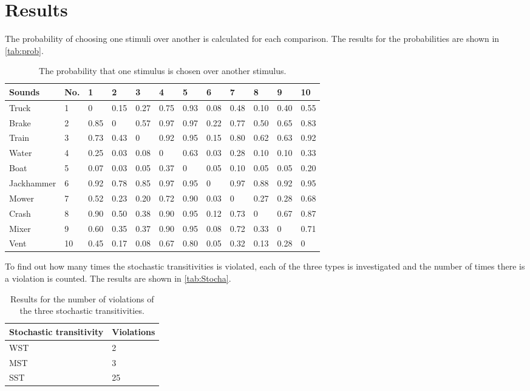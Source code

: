 \section*{Results}
\label{Results}
%
The probability of choosing one stimuli over another is calculated for each comparison. The results for the probabilities are shown in \autoref{tab:prob}. 
%
\begin{table}[H]
\centering
\begin{tabular}{@{}llllllllllll@{}}
\toprule
Sounds     & No. & 1    & 2    & 3    & 4    & 5    & 6    & 7    & 8    & 9    & 10 \\ \midrule
Truck      & 1   & 0    & 0.15 & 0.27 & 0.75 & 0.93 & 0.08 & 0.48 & 0.10 & 0.40 & 0.55 \\
Brake      & 2   & 0.85 & 0    & 0.57 & 0.97 & 0.97 & 0.22 & 0.77 & 0.50 & 0.65 & 0.83 \\
Train      & 3   & 0.73 & 0.43 & 0    & 0.92 & 0.95 & 0.15 & 0.80 & 0.62 & 0.63 & 0.92 \\
Water      & 4   & 0.25 & 0.03 & 0.08 & 0    & 0.63 & 0.03 & 0.28 & 0.10 & 0.10 & 0.33 \\
Boat       & 5   & 0.07 & 0.03 & 0.05 & 0.37 & 0    & 0.05 & 0.10 & 0.05 & 0.05 & 0.20 \\
Jackhammer & 6   & 0.92 & 0.78 & 0.85 & 0.97 & 0.95 & 0    & 0.97 & 0.88 & 0.92 & 0.95 \\
Mower      & 7   & 0.52 & 0.23 & 0.20 & 0.72 & 0.90 & 0.03 & 0    & 0.27 & 0.28 & 0.68 \\
Crash      & 8   & 0.90 & 0.50 & 0.38 & 0.90 & 0.95 & 0.12 & 0.73 & 0    & 0.67 & 0.87 \\
Mixer      & 9   & 0.60 & 0.35 & 0.37 & 0.90 & 0.95 & 0.08 & 0.72 & 0.33 & 0    & 0.71 \\
Vent       & 10  & 0.45 & 0.17 & 0.08 & 0.67 & 0.80 & 0.05 & 0.32 & 0.13 & 0.28 & 0  \\ \bottomrule
\end{tabular}
\caption{The probability that one stimulus is chosen over another stimulus.}
\label{tab:prob}
\end{table} 
\noindent 
%
To find out how many times the stochastic transitivities is violated, each of the three types is investigated and the number of times there is a violation is counted. The results are shown in \autoref{tab:Stocha}. 
%
\begin{table}[H]
\centering
\begin{tabular}{@{}ll@{}}
\toprule
Stochastic transitivity     & Violations \\ \midrule
WST      & 2   \\
MST      & 3   \\
SST      & 25   \\ \bottomrule
\end{tabular}
\caption{Results for the number of violations of the three stochastic transitivities.}
\label{tab:Stocha}
\end{table} 
